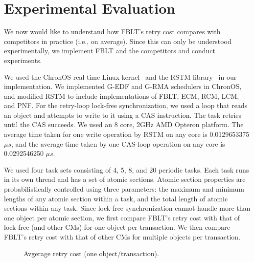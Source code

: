 \documentclass[conference]{IEEEtran}
\begin{document}
\section{Experimental Evaluation}\label{exp_eval}

We now would like to understand how FBLT's retry cost compares with competitors in practice (i.e., on average). Since this can only be understood experimentally, we implement FBLT and the competitors and conduct experiments. 


We used the ChronOS real-time Linux kernel~\cite{dellinger2011chronos}
and the RSTM library~\cite{marathe2006lowering} in our implementation. We implemented G-EDF and G-RMA schedulers in ChronOS, and modified RSTM to include implementations of FBLT, ECM, RCM, LCM, and PNF. For the retry-loop lock-free synchronization, we used a loop that reads an object and attempts to write to it using a CAS  instruction. The task retries until the CAS succeeds. We used an 8 core, 2GHz AMD Opteron platform. The average time taken for one write operation by RSTM on any core is 0.0129653375$\mu s$, and the average time taken by one CAS-loop operation on any core is 0.0292546250 $\mu s$.

We used four task sets consisting of 4, 5, 8, and 20 periodic tasks. Each task runs in its own thread and has a set of atomic sections. Atomic section properties are probabilistically controlled using three parameters: the maximum and minimum lengths of any atomic section within a task, and the total length of atomic sections within any task. Since lock-free synchronization cannot handle more than one object per atomic section, we first compare FBLT's retry cost with that of lock-free (and other CMs) for one object per transaction. We then compare FBLT's retry cost with that of other CMs for multiple objects per transaction.


\begin{figure}
\centering
{}
\caption{Avgerage retry cost (one object/transaction).}

\label{fig:fblt_results_uniobject}
\end{figure}
\end{document}
